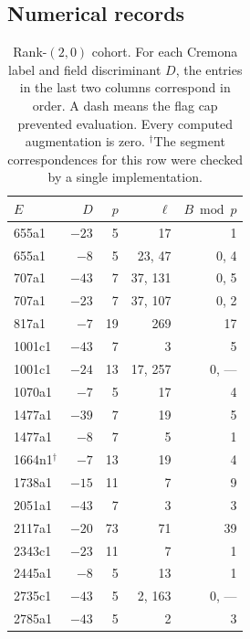 \documentclass[11pt]{article}
\begin{document}
\clearpage
\begin{appendices}
\section{Numerical records}

\begin{table}[!ht]
\centering
\caption{Rank-$(2,0)$ cohort. For each Cremona label and field discriminant $D$, the entries in the last two columns correspond in order. A dash means the flag cap prevented evaluation. Every computed augmentation is zero. $^\dagger$The segment correspondences for this row were checked by a single implementation.}\label{cohort}
\begin{tabular}{lrrrr}
\toprule
$E$ & $D$ & $p$ & $\ell$ & $B\bmod p$\\
\midrule
655a1 & $-23$ & 5 & 17 & 1\\
655a1 & $-8$ & 5 & 23, 47 & 0, 4\\
707a1 & $-43$ & 7 & 37, 131 & 0, 5\\
707a1 & $-23$ & 7 & 37, 107 & 0, 2\\
817a1 & $-7$ & 19 & 269 & 17\\
1001c1 & $-43$ & 7 & 3 & 5\\
1001c1 & $-24$ & 13 & 17, 257 & 0, ---\\
1070a1 & $-7$ & 5 & 17 & 4\\
1477a1 & $-39$ & 7 & 19 & 5\\
1477a1 & $-8$ & 7 & 5 & 1\\
1664n1$^\dagger$ & $-7$ & 13 & 19 & 4\\
1738a1 & $-15$ & 11 & 7 & 9\\
2051a1 & $-43$ & 7 & 3 & 3\\
2117a1 & $-20$ & 73 & 71 & 39\\
2343c1 & $-23$ & 11 & 7 & 1\\
2445a1 & $-8$ & 5 & 13 & 1\\
2735c1 & $-43$ & 5 & 2, 163 & 0, ---\\
2785a1 & $-43$ & 5 & 2 & 3\\
\bottomrule
\end{tabular}
\end{table}


\end{appendices}
\end{document}
